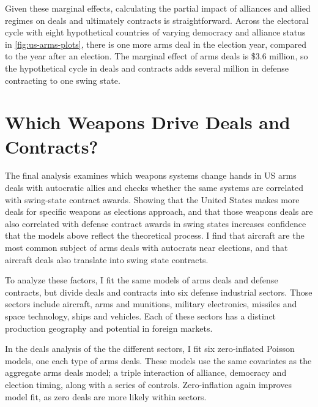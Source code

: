 \documentclass[12pt]{article}
\begin{document}
Given these marginal effects, calculating the partial impact of alliances and allied regimes on deals and ultimately contracts is straightforward. 
Across the electoral cycle with eight hypothetical countries of varying democracy and alliance status in \autoref{fig:us-arms-plots}, there is one more arms deal in the election year, compared to the year after an election. 
The marginal effect of arms deals is \$3.6 million, so the hypothetical cycle in deals and contracts adds several million in defense contracting to one swing state. 
%
%

 


\section{Which Weapons Drive Deals and Contracts?} 


The final analysis examines which weapons systems change hands in US arms deals with autocratic allies and checks whether the same systems are correlated with swing-state contract awards. 
Showing that the United States makes more deals for specific weapons as elections approach, and that those weapons deals are also correlated with defense contract awards in swing states increases confidence that the models above reflect the theoretical process. 
I find that aircraft are the most common subject of arms deals with autocrats near elections, and that aircraft deals also translate into swing state contracts.


To analyze these factors, I fit the same models of arms deals and defense contracts, but divide deals and contracts into six defense industrial sectors. 
Those sectors include aircraft, arms and munitions, military electronics, missiles and space technology, ships and vehicles.  
Each of these sectors has a distinct production geography and potential in foreign markets.


In the deals analysis of the the different sectors, I fit six zero-inflated Poisson models, one each type of arms deals. 
These models use the same covariates as the aggregate arms deals model; a triple interaction of alliance, democracy and election timing, along with a series of controls. 
Zero-inflation again improves model fit, as zero deals are more likely within sectors. 
\end{document}
